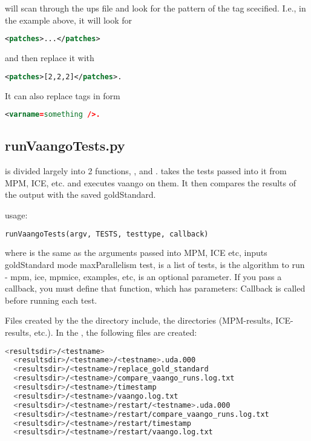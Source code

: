  will scan through the ups file and look for the pattern of the tag 
scecified.  I.e., in the example above, it will look for 
\begin{lstlisting}[language=XML]
<patches>...</patches>
\end{lstlisting}
and then replace it with 
\begin{lstlisting}[language=XML]
<patches>[2,2,2]</patches>. 
\end{lstlisting}
It can also replace tags in form 
\begin{lstlisting}[language=XML]
<varname=something />.
\end{lstlisting}

\subsection{runVaangoTests.py}
 is divided largely into 2 functions, , 
and .
 takes the tests passed into it from MPM, ICE, etc. 
and executes vaango on them.  It then compares the results of the output with the 
saved goldStandard.

usage:
\begin{lstlisting}[language=Python]
  runVaangoTests(argv, TESTS, testtype, callback)
\end{lstlisting}
where  is the same as the arguments passed into MPM, ICE etc,
 inputs goldStandard mode maxParallelism test,
 is a list of tests, 
 is the algorithm to run - mpm, ice, mpmice, examples, etc,
 is an optional parameter.  If you pass a callback, you must define 
that function, which has parameters:
Callback is called before running each test.

Files created by  the the  
directory include, the directories  (MPM-results, ICE-results, etc.).
In the , the following files are created:
\begin{lstlisting}[language=sh, backgroundcolor=\color{background}]
  <resultsdir>/<testname>
  <resultsdir>/<testname>/<testname>.uda.000
  <resultsdir>/<testname>/replace_gold_standard
  <resultsdir>/<testname>/compare_vaango_runs.log.txt
  <resultsdir>/<testname>/timestamp
  <resultsdir>/<testname>/vaango.log.txt
  <resultsdir>/<testname>/restart/<testname>.uda.000
  <resultsdir>/<testname>/restart/compare_vaango_runs.log.txt
  <resultsdir>/<testname>/restart/timestamp
  <resultsdir>/<testname>/restart/vaango.log.txt
\end{lstlisting}
  
